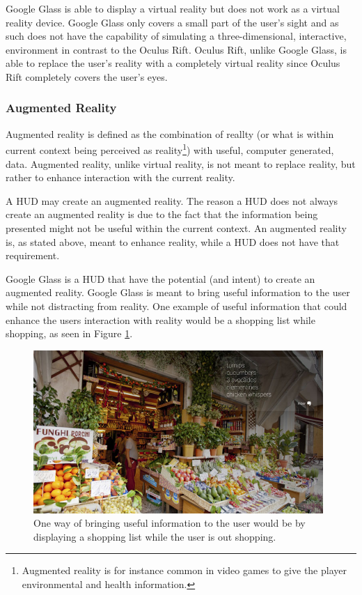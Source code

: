 Google Glass is able to display a virtual reality but does not work as a virtual reality device. Google Glass only covers a small part of the user's sight and as such does not have the capability of simulating a three-dimensional, interactive, environment in contrast to the Oculus Rift. Oculus Rift, unlike Google Glass, is able to replace the user's reality with a completely virtual reality since Oculus Rift completely covers the user's eyes.

\subsubsection{Augmented Reality}
\label{subsubsec:ar}
Augmented reality\cite{augmentedRealityDef} is defined as the combination of reallty (or what is within current context being perceived as reality\footnote{Augmented reality is for instance common in video games to give the player environmental and health information.}) with useful, computer generated, data. Augmented reality, unlike virtual reality, is not meant to replace reality, but rather to enhance interaction with the current reality.

A HUD may create an augmented reality. The reason a HUD does not always create an augmented reality is due to the fact that the information being presented might not be useful within the current context. An augmented reality is, as stated above, meant to enhance reality, while a HUD does not have that requirement.

Google Glass is a HUD that have the potential (and intent) to create an augmented reality. Google Glass is meant to bring useful information to the user while not distracting from reality. One example of useful information that could enhance the users interaction with reality would be a shopping list while shopping, as seen in Figure \ref{GlassShopping}.

	\begin{figure}[ht!]
		\centering
		\includegraphics[width=110mm]{images/GoogleGlassKeepRevelant}
		\caption{One way of bringing useful information to the user would be by displaying a shopping list while the user is out shopping.\cite{glassDesignPrinciples}}
		\label{GlassShopping}
	\end{figure}
	
